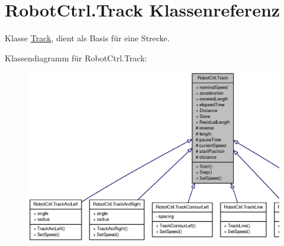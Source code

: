 \hypertarget{class_robot_ctrl_1_1_track}{
\section{RobotCtrl.Track Klassenreferenz}
\label{class_robot_ctrl_1_1_track}
}


Klasse \hyperlink{class_robot_ctrl_1_1_track}{Track}, dient als Basis f\"{u}r eine Strecke.  




Klassendiagramm für RobotCtrl.Track:\nopagebreak
\begin{figure}[H]
\begin{center}
\leavevmode
\includegraphics[width=400pt]{class_robot_ctrl_1_1_track__inherit__graph}
\end{center}
\end{figure}


